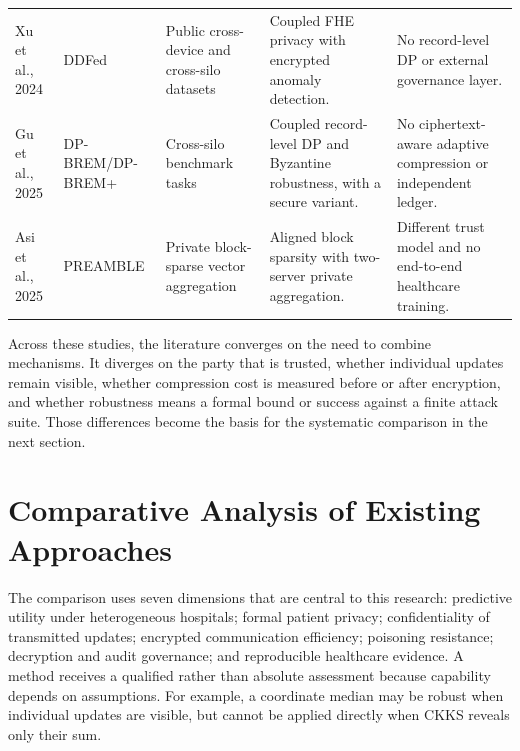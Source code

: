 \begin{longtable}{@{}p{2.5cm}p{2.2cm}p{2.8cm}p{3.1cm}p{3.1cm}@{}}
Xu et al., 2024 \cite{xu2024ddfed} & DDFed & Public cross-device and cross-silo datasets & Coupled FHE privacy with encrypted anomaly detection. & No record-level DP or external governance layer. \\
Gu et al., 2025 \cite{gu2025dpbrem} & DP-BREM/DP-BREM+ & Cross-silo benchmark tasks & Coupled record-level DP and Byzantine robustness, with a secure variant. & No ciphertext-aware adaptive compression or independent ledger. \\
Asi et al., 2025 \cite{asi2025preamble} & PREAMBLE & Private block-sparse vector aggregation & Aligned block sparsity with two-server private aggregation. & Different trust model and no end-to-end healthcare training. \\
\end{longtable}

Across these studies, the literature converges on the need to combine mechanisms. It diverges on the party that is trusted, whether individual updates remain visible, whether compression cost is measured before or after encryption, and whether robustness means a formal bound or success against a finite attack suite. Those differences become the basis for the systematic comparison in the next section.

\section{Comparative Analysis of Existing Approaches}
\label{sec:comparative-analysis}

The comparison uses seven dimensions that are central to this research: predictive utility under heterogeneous hospitals; formal patient privacy; confidentiality of transmitted updates; encrypted communication efficiency; poisoning resistance; decryption and audit governance; and reproducible healthcare evidence. A method receives a qualified rather than absolute assessment because capability depends on assumptions. For example, a coordinate median may be robust when individual updates are visible, but cannot be applied directly when CKKS reveals only their sum.

